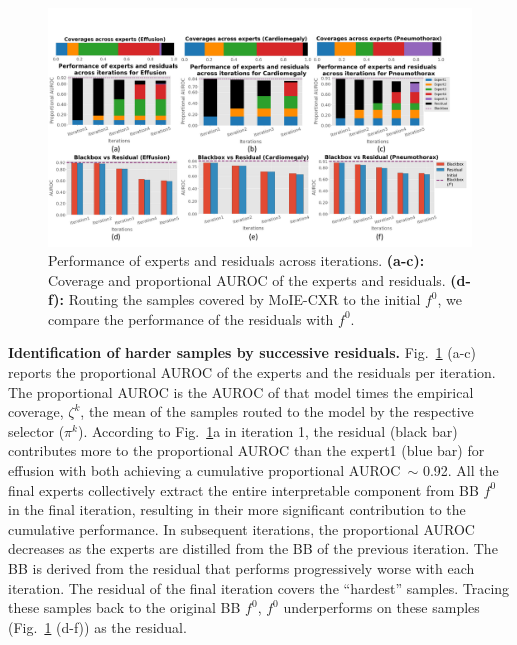\begin{figure}[t]
\begin{center}
\centerline{\includegraphics[width=\linewidth]{plots/main/Experts.pdf}}
\caption{Performance of experts and residuals across iterations. 
\textbf{(a-c):} Coverage and proportional AUROC of the experts and residuals.
\textbf{(d-f):} Routing the samples covered by MoIE-CXR to the initial $f^0$, we compare the performance of the residuals with $f^0$.
}
\label{fig:expert_performance_cv_vit}
\end{center}
\end{figure}

\noindent \textbf{Identification of harder samples by successive residuals.}
Fig.~\ref{fig:expert_performance_cv_vit} (a-c) reports the proportional AUROC of the experts and the residuals per iteration. The proportional AUROC is the AUROC of that model times the empirical coverage, $\zeta^k$, the mean of the samples routed to the model by the respective selector ($\pi^k$).
According to Fig.~\ref{fig:expert_performance_cv_vit}a in iteration 1, the residual (black bar) contributes more to the proportional AUROC than the expert1 (blue bar) for effusion with both achieving a cumulative proportional AUROC~$\sim$ 0.92. All the final experts collectively extract the entire interpretable component from BB $f^0$ in the final iteration, resulting in their more significant contribution to the cumulative performance. In subsequent iterations, the proportional AUROC decreases as the experts are distilled from the BB of the previous iteration. The BB is derived from the residual that performs progressively worse with each iteration. The residual of the final iteration covers the ``hardest'' samples. Tracing these samples back to the original BB $f^0$, $f^0$ underperforms on these samples (Fig.~\ref{fig:expert_performance_cv_vit} (d-f)) as the residual.


